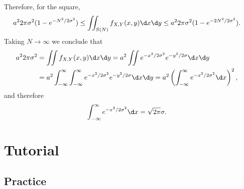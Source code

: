 \begin{exercise}
\begin{solution}
Therefore, for the square,
\begin{equation}
a^{2}2\pi{\sigma^{2}} (1-e^{-N^{2}/2\sigma^{2}}) \leq
  \iint_{S(N)}f_{X,Y}(x,y) \d x\d y \leq
a^{2}2\pi{\sigma^{2}} (1-e^{-2N^{2}/2\sigma^{2}}).
\end{equation}
Taking $N\to\infty$ we conclude that
\begin{align}
a^{2}2\pi{\sigma^{2}}
&=\iint f_{X,Y}(x,y) \d x\d y
=a^{2}  \iint e^{-x^{2}/2\sigma^{2}} e^{-y^{2}/2\sigma} \d x\d y\\
&=a^{2}  \int_{-\infty}^{\infty} \int_{-\infty}^{\infty }e^{-x^{2}/2\sigma^{2}} e^{-y^{2}/2\sigma} \d x\d y
=a^{2} \left( \int_{-\infty}^{\infty }e^{-x^{2}/2\sigma^{2}} \d x\right)^{2},
\end{align}
and therefore
\begin{equation}
\label{eq:0518}
\int_{-\infty}^{\infty }e^{-x^{2}/2\sigma^{2}} \d x = \sqrt{2 \pi}\sigma.
\end{equation}
\end{solution}
\end{exercise}


\section{Tutorial}
\label{sec:tutorial}


\subsection{Practice}


